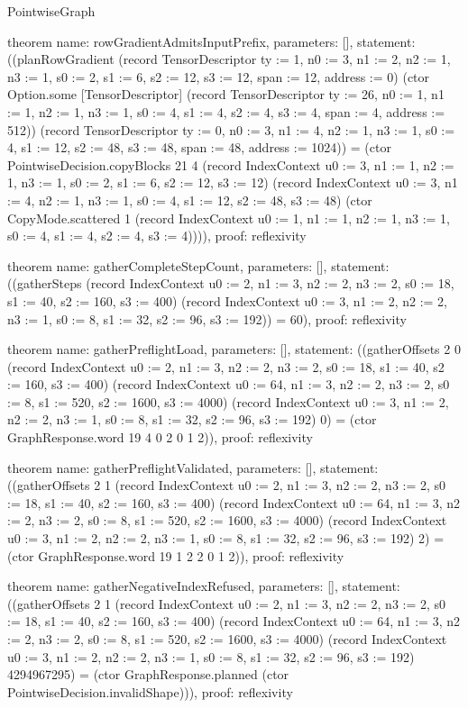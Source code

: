 \begin{lexlean}{PointwiseGraph}
\begin{semanticmodule}
theorem{
  name: rowGradientAdmitsInputPrefix,
  parameters: [],
  statement: ((planRowGradient (record TensorDescriptor {ty := 1, n0 := 3, n1 := 2, n2 := 1, n3 := 1, s0 := 2, s1 := 6, s2 := 12, s3 := 12, span := 12, address := 0}) (ctor Option.some [TensorDescriptor] (record TensorDescriptor {ty := 26, n0 := 1, n1 := 1, n2 := 1, n3 := 1, s0 := 4, s1 := 4, s2 := 4, s3 := 4, span := 4, address := 512})) (record TensorDescriptor {ty := 0, n0 := 3, n1 := 4, n2 := 1, n3 := 1, s0 := 4, s1 := 12, s2 := 48, s3 := 48, span := 48, address := 1024})) = (ctor PointwiseDecision.copyBlocks 21 4 (record IndexContext {u0 := 3, n1 := 1, n2 := 1, n3 := 1, s0 := 2, s1 := 6, s2 := 12, s3 := 12}) (record IndexContext {u0 := 3, n1 := 4, n2 := 1, n3 := 1, s0 := 4, s1 := 12, s2 := 48, s3 := 48}) (ctor CopyMode.scattered 1 (record IndexContext {u0 := 1, n1 := 1, n2 := 1, n3 := 1, s0 := 4, s1 := 4, s2 := 4, s3 := 4})))),
  proof: reflexivity{}
}

theorem{
  name: gatherCompleteStepCount,
  parameters: [],
  statement: ((gatherSteps (record IndexContext {u0 := 2, n1 := 3, n2 := 2, n3 := 2, s0 := 18, s1 := 40, s2 := 160, s3 := 400}) (record IndexContext {u0 := 3, n1 := 2, n2 := 2, n3 := 1, s0 := 8, s1 := 32, s2 := 96, s3 := 192})) = 60),
  proof: reflexivity{}
}

theorem{
  name: gatherPreflightLoad,
  parameters: [],
  statement: ((gatherOffsets 2 0 (record IndexContext {u0 := 2, n1 := 3, n2 := 2, n3 := 2, s0 := 18, s1 := 40, s2 := 160, s3 := 400}) (record IndexContext {u0 := 64, n1 := 3, n2 := 2, n3 := 2, s0 := 8, s1 := 520, s2 := 1600, s3 := 4000}) (record IndexContext {u0 := 3, n1 := 2, n2 := 2, n3 := 1, s0 := 8, s1 := 32, s2 := 96, s3 := 192}) 0) = (ctor GraphResponse.word 19 4 0 2 0 1 2)),
  proof: reflexivity{}
}

theorem{
  name: gatherPreflightValidated,
  parameters: [],
  statement: ((gatherOffsets 2 1 (record IndexContext {u0 := 2, n1 := 3, n2 := 2, n3 := 2, s0 := 18, s1 := 40, s2 := 160, s3 := 400}) (record IndexContext {u0 := 64, n1 := 3, n2 := 2, n3 := 2, s0 := 8, s1 := 520, s2 := 1600, s3 := 4000}) (record IndexContext {u0 := 3, n1 := 2, n2 := 2, n3 := 1, s0 := 8, s1 := 32, s2 := 96, s3 := 192}) 2) = (ctor GraphResponse.word 19 1 2 2 0 1 2)),
  proof: reflexivity{}
}

theorem{
  name: gatherNegativeIndexRefused,
  parameters: [],
  statement: ((gatherOffsets 2 1 (record IndexContext {u0 := 2, n1 := 3, n2 := 2, n3 := 2, s0 := 18, s1 := 40, s2 := 160, s3 := 400}) (record IndexContext {u0 := 64, n1 := 3, n2 := 2, n3 := 2, s0 := 8, s1 := 520, s2 := 1600, s3 := 4000}) (record IndexContext {u0 := 3, n1 := 2, n2 := 2, n3 := 1, s0 := 8, s1 := 32, s2 := 96, s3 := 192}) 4294967295) = (ctor GraphResponse.planned (ctor PointwiseDecision.invalidShape))),
  proof: reflexivity{}
}


\end{semanticmodule}
\end{lexlean}

